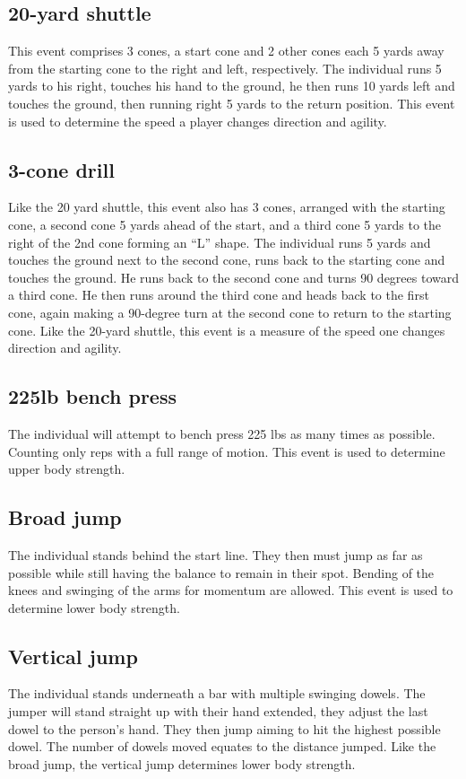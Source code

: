 \documentclass[confrence]{IEEEtran}
\begin{document}
\subsection*{20-yard shuttle}
This event comprises 3 cones, a start cone and 2 other cones each 5 yards away from the starting cone to the right and left, respectively.
The individual runs 5 yards to his right, touches his hand to the ground, he then runs 10 yards left and touches the ground, then running right 5 yards to the return position.
This event is used to determine the speed a player changes direction and agility.
\subsection*{3-cone drill}
Like the 20 yard shuttle, this event also has 3 cones, arranged with the starting cone, a second cone 5 yards ahead of the start, and a third cone 5 yards to the right of the 2nd cone forming an “L” shape. 
The individual runs 5 yards and touches the ground next to the second cone, runs back to the starting cone and touches the ground. 
He runs back to the second cone and turns 90 degrees toward a third cone. 
He then runs around the third cone and heads back to the first cone, again making a 90-degree turn at the second cone to return to the starting cone. 
Like the 20-yard shuttle, this event is a measure of the speed one changes direction and agility.
\subsection*{225lb bench press}
The individual will attempt to bench press 225 lbs as many times as possible. 
Counting only reps with a full range of motion.
This event is used to determine upper body strength. 
\subsection*{Broad jump}
The individual stands behind the start line. 
They then must jump as far as possible while still having the balance to remain in their spot.
Bending of the knees and swinging of the arms for momentum are allowed.
This event is used to determine lower body strength.
\subsection*{Vertical jump}
The individual stands underneath a bar with multiple swinging dowels. 
The jumper will stand straight up with their hand extended, they adjust the last dowel to the person's hand.
They then jump aiming to hit the highest possible dowel. 
The number of dowels moved equates to the distance jumped.
Like the broad jump, the vertical jump determines lower body strength.
\end{document}
